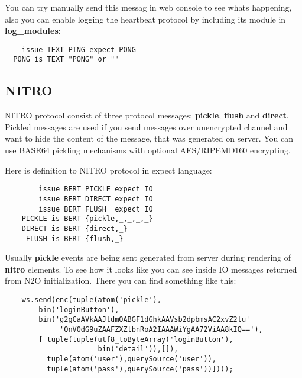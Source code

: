 You can try manually send this messag in web console to see whats happening,
also you can enable logging the heartbeat protocol by including its
module in {\bf log\_modules}:

\vspace{1\baselineskip}
\begin{lstlisting}
    issue TEXT PING expect PONG
  PONG is TEXT "PONG" or ""
\end{lstlisting}
\vspace{1\baselineskip}


\newpage
\subsection{NITRO}

NITRO protocol consist of three protocol messages: {\bf pickle}, {\bf flush} and {\bf direct}.
Pickled messages are used if you send messages over unencrypted
channel and want to hide the content of the message,
that was generated on server. You can use BASE64 pickling mechanisms
with optional AES/RIPEMD160 encrypting.

Here is definition to NITRO protocol in expect language:

\vspace{1\baselineskip}
\begin{lstlisting}
        issue BERT PICKLE expect IO
        issue BERT DIRECT expect IO
        issue BERT FLUSH  expect IO
    PICKLE is BERT {pickle,_,_,_,_}
    DIRECT is BERT {direct,_}
     FLUSH is BERT {flush,_}
\end{lstlisting}
\vspace{1\baselineskip}

Usually {\bf pickle} events are being sent generated from server during
rendering of {\bf nitro} elements. To see how it looks like you can see
inside IO messages returned from N2O initialization. There you can find
something like this:

\vspace{1\baselineskip}
\begin{lstlisting}
    ws.send(enc(tuple(atom('pickle'),
        bin('loginButton'),
        bin('g2gCaAVkAAJldmQABGF1dGhkAAVsb2dpbmsAC2xvZ2lu'
             'QnV0dG9uZAAFZXZlbnRoA2IAAAWiYgAA72ViAA8kIQ=='),
        [ tuple(tuple(utf8_toByteArray('loginButton'),
                      bin('detail')),[]),
          tuple(atom('user'),querySource('user')),
          tuple(atom('pass'),querySource('pass'))])));
\end{lstlisting}
\vspace{1\baselineskip}

